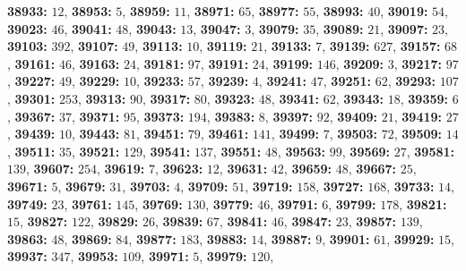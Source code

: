 \textsf{\bfseries 38933:} $12$, \textsf{\bfseries 38953:} $5$, \textsf{\bfseries 38959:} $11$, \textsf{\bfseries 38971:} $65$, \textsf{\bfseries 38977:} $55$, \textsf{\bfseries 38993:} $40$, \textsf{\bfseries 39019:} $54$, \textsf{\bfseries 39023:} $46$, \textsf{\bfseries 39041:} $48$, \textsf{\bfseries 39043:} $13$, \textsf{\bfseries 39047:} $3$, \textsf{\bfseries 39079:} $35$, \textsf{\bfseries 39089:} $21$, \textsf{\bfseries 39097:} $23$, \textsf{\bfseries 39103:} $392$, \textsf{\bfseries 39107:} $49$, \textsf{\bfseries 39113:} $10$, \textsf{\bfseries 39119:} $21$, \textsf{\bfseries 39133:} $7$, \textsf{\bfseries 39139:} $627$, \textsf{\bfseries 39157:} $68$, \textsf{\bfseries 39161:} $46$, \textsf{\bfseries 39163:} $24$, \textsf{\bfseries 39181:} $97$, \textsf{\bfseries 39191:} $24$, \textsf{\bfseries 39199:} $146$, \textsf{\bfseries 39209:} $3$, \textsf{\bfseries 39217:} $97$, \textsf{\bfseries 39227:} $49$, \textsf{\bfseries 39229:} $10$, \textsf{\bfseries 39233:} $57$, \textsf{\bfseries 39239:} $4$, \textsf{\bfseries 39241:} $47$, \textsf{\bfseries 39251:} $62$, \textsf{\bfseries 39293:} $107$, \textsf{\bfseries 39301:} $253$, \textsf{\bfseries 39313:} $90$, \textsf{\bfseries 39317:} $80$, \textsf{\bfseries 39323:} $48$, \textsf{\bfseries 39341:} $62$, \textsf{\bfseries 39343:} $18$, \textsf{\bfseries 39359:} $6$, \textsf{\bfseries 39367:} $37$, \textsf{\bfseries 39371:} $95$, \textsf{\bfseries 39373:} $194$, \textsf{\bfseries 39383:} $8$, \textsf{\bfseries 39397:} $92$, \textsf{\bfseries 39409:} $21$, \textsf{\bfseries 39419:} $27$, \textsf{\bfseries 39439:} $10$, \textsf{\bfseries 39443:} $81$, \textsf{\bfseries 39451:} $79$, \textsf{\bfseries 39461:} $141$, \textsf{\bfseries 39499:} $7$, \textsf{\bfseries 39503:} $72$, \textsf{\bfseries 39509:} $14$, \textsf{\bfseries 39511:} $35$, \textsf{\bfseries 39521:} $129$, \textsf{\bfseries 39541:} $137$, \textsf{\bfseries 39551:} $48$, \textsf{\bfseries 39563:} $99$, \textsf{\bfseries 39569:} $27$, \textsf{\bfseries 39581:} $139$, \textsf{\bfseries 39607:} $254$, \textsf{\bfseries 39619:} $7$, \textsf{\bfseries 39623:} $12$, \textsf{\bfseries 39631:} $42$, \textsf{\bfseries 39659:} $48$, \textsf{\bfseries 39667:} $25$, \textsf{\bfseries 39671:} $5$, \textsf{\bfseries 39679:} $31$, \textsf{\bfseries 39703:} $4$, \textsf{\bfseries 39709:} $51$, \textsf{\bfseries 39719:} $158$, \textsf{\bfseries 39727:} $168$, \textsf{\bfseries 39733:} $14$, \textsf{\bfseries 39749:} $23$, \textsf{\bfseries 39761:} $145$, \textsf{\bfseries 39769:} $130$, \textsf{\bfseries 39779:} $46$, \textsf{\bfseries 39791:} $6$, \textsf{\bfseries 39799:} $178$, \textsf{\bfseries 39821:} $15$, \textsf{\bfseries 39827:} $122$, \textsf{\bfseries 39829:} $26$, \textsf{\bfseries 39839:} $67$, \textsf{\bfseries 39841:} $46$, \textsf{\bfseries 39847:} $23$, \textsf{\bfseries 39857:} $139$, \textsf{\bfseries 39863:} $48$, \textsf{\bfseries 39869:} $84$, \textsf{\bfseries 39877:} $183$, \textsf{\bfseries 39883:} $14$, \textsf{\bfseries 39887:} $9$, \textsf{\bfseries 39901:} $61$, \textsf{\bfseries 39929:} $15$, \textsf{\bfseries 39937:} $347$, \textsf{\bfseries 39953:} $109$, \textsf{\bfseries 39971:} $5$, \textsf{\bfseries 39979:} $120$, 
